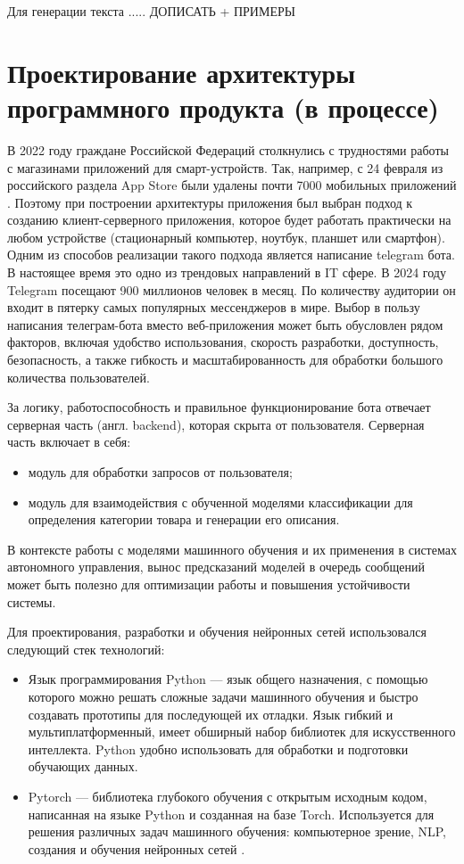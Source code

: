 \documentclass[a4paper,12pt]{extarticle}
\begin{document}
Для генерации текста ..... ДОПИСАТЬ + ПРИМЕРЫ






\newpage
\section{Проектирование архитектуры программного продукта (в процессе)}
В 2022 году граждане Российской Федераций столкнулись с трудностями работы с магазинами приложений для смарт-устройств. Так, например, с 24 февраля из российского раздела App Store были удалены почти 7000 мобильных приложений \cite{russia_app}. Поэтому при построении архитектуры приложения был выбран подход к созданию клиент-серверного приложения, которое будет работать практически на любом устройстве (стационарный компьютер, ноутбук, планшет или смартфон). Одним из способов реализации такого подхода является написание telegram  бота. В настоящее время это одно из трендовых направлений в IT сфере. В 2024 году Telegram посещают 900 миллионов человек в месяц. По количеству аудитории он входит в пятерку самых популярных мессенджеров в мире. Выбор в пользу написания телеграм-бота вместо веб-приложения может быть обусловлен рядом факторов, включая удобство использования, скорость разработки, доступность, безопасность, а также гибкость и масштабированность для обработки большого количества пользователей.

За логику, работоспособность и правильное функционирование бота 
отвечает серверная часть (англ. backend), которая скрыта от пользователя. Серверная часть включает в себя:
\begin{itemize}
	\item модуль для обработки запросов от пользователя;
	\item модуль для взаимодействия с обученной моделями классификации для определения категории товара и генерации его описания.
\end{itemize}

В контексте работы с моделями машинного обучения и их применения в системах автономного управления, вынос предсказаний моделей в очередь сообщений может быть полезно для оптимизации работы и повышения устойчивости системы.

Для проектирования, разработки и обучения нейронных сетей использовался следующий стек технологий:
\begin{itemize}
	\item Язык программирования Python — язык общего назначения, с помощью которого можно решать сложные задачи машинного обучения и быстро создавать прототипы для последующей их отладки. Язык гибкий и мультиплатформенный, имеет обширный набор библиотек для искусственного интеллекта. Python удобно использовать для обработки и подготовки обучающих данных.
	\item Pytorch — библиотека глубокого обучения с открытым исходным кодом, написанная на языке Python и созданная на базе Torch. Используется для решения различных задач машинного обучения: компьютерное зрение, NLP, создания и обучения нейронных сетей \cite{pytorch}.
\end{itemize}
\end{document}
